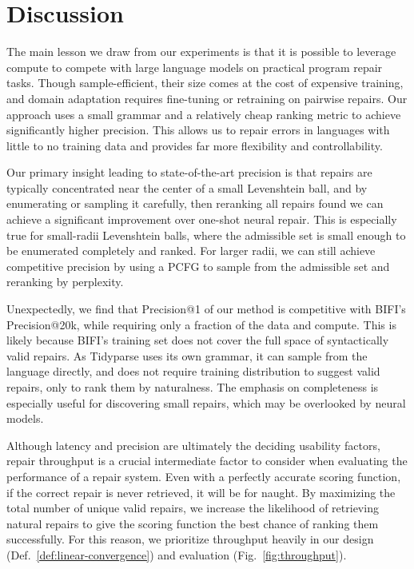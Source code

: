 \documentclass[sigplan,review,acmsmall,nonacm,anonymous]{acmart}\settopmatter{printfolios=false,printccs=false,printacmref=false}
\begin{document}
  \section{Discussion}\label{sec:discussion}

  The main lesson we draw from our experiments is that it is possible to leverage compute to compete with large language models on practical program repair tasks. Though sample-efficient, their size comes at the cost of expensive training, and domain adaptation requires fine-tuning or retraining on pairwise repairs. Our approach uses a small grammar and a relatively cheap ranking metric to achieve significantly higher precision. This allows us to repair errors in languages with little to no training data and provides far more flexibility and controllability.

  Our primary insight leading to state-of-the-art precision is that repairs are typically concentrated near the center of a small Levenshtein ball, and by enumerating or sampling it carefully, then reranking all repairs found we can achieve a significant improvement over one-shot neural repair. This is especially true for small-radii Levenshtein balls, where the admissible set is small enough to be enumerated completely and ranked. For larger radii, we can still achieve competitive precision by using a PCFG to sample from the admissible set and reranking by perplexity.

   Unexpectedly, we find that Precision@1 of our method is competitive with BIFI's Precision@20k, while requiring only a fraction of the data and compute. This is likely because BIFI's training set does not cover the full space of syntactically valid repairs. As Tidyparse uses its own grammar, it can sample from the language directly, and does not require training distribution to suggest valid repairs, only to rank them by naturalness. The emphasis on completeness is especially useful for discovering small repairs, which may be overlooked by neural models.

   Although latency and precision are ultimately the deciding usability factors, repair throughput is a crucial intermediate factor to consider when evaluating the performance of a repair system. Even with a perfectly accurate scoring function, if the correct repair is never retrieved, it will be for naught. By maximizing the total number of unique valid repairs, we increase the likelihood of retrieving natural repairs to give the scoring function the best chance of ranking them successfully. For this reason, we prioritize throughput heavily in our design (Def.~\ref{def:linear-convergence}) and evaluation (Fig.~\ref{fig:throughput}).
\end{document}
